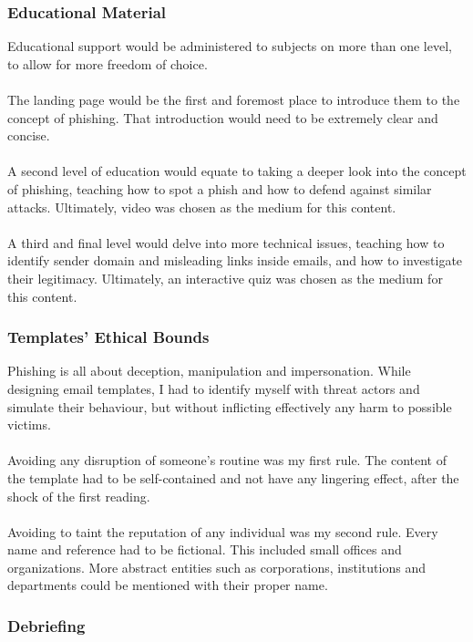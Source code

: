 \documentclass[a4paper]{article}
\begin{document}
\subsubsection{Educational Material}

Educational support would be administered to subjects on more than one level, to allow for more freedom of choice. 
\\ \\
The landing page would be the first and foremost place to introduce them to the concept of phishing. That introduction would need to be extremely clear and concise.
\\ \\
A second level of education would equate to taking a deeper look into the concept of phishing, teaching how to spot a phish and how to defend against similar attacks. Ultimately, video was chosen as the medium for this content.
\\ \\
A third and final level would delve into more technical issues, teaching how to identify sender domain and misleading links inside emails, and how to investigate their legitimacy. Ultimately, an interactive quiz was chosen as the medium for this content.

\subsubsection{Templates' Ethical Bounds}

Phishing is all about deception, manipulation and impersonation. While designing email templates, I had to identify myself with threat actors and simulate their behaviour, but without inflicting effectively any harm to possible victims.
\\ \\
Avoiding any disruption of someone's routine was my first rule. The content of the template had to be self-contained and not have any lingering effect, after the shock of the first reading.
\\ \\
Avoiding to taint the reputation of any individual was my second rule. Every name and reference had to be fictional. This included small offices and organizations. More abstract entities such as corporations, institutions and departments could be mentioned with their proper name.

\subsubsection{Debriefing}
\end{document}
